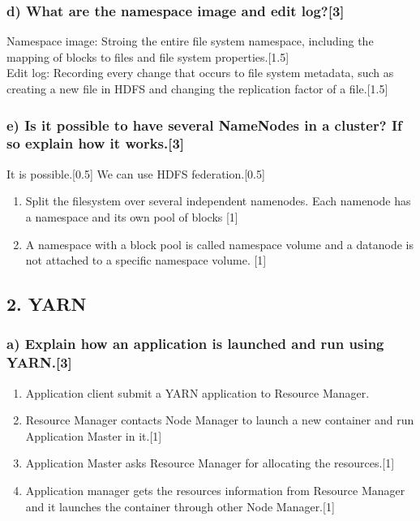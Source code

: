 \documentclass[11pt,a4paper]{article}
\begin{document}
\subsubsection*{d) What are the namespace image and edit log?[3]}
Namespace image: Stroing the entire file system namespace,  including the mapping of blocks to files and file system properties.[1.5]\\
Edit log: Recording every change that occurs to file system metadata, such as creating a new file in HDFS and changing the replication factor of a file.[1.5]

\subsubsection*{e) Is it possible to have several NameNodes in a cluster? If so explain how it works.[3]}
It is possible.[0.5] We can use HDFS federation.[0.5] 
\begin{enumerate}
	\item Split the filesystem over several independent namenodes. Each namenode has a namespace and its own pool of blocks [1]
	\item A namespace with a block pool is called namespace volume and a datanode is not attached to a specific namespace volume. [1]
\end{enumerate}

\subsection*{2. YARN}
\subsubsection*{a) Explain how an application is launched and run using YARN.[3]}
\begin{enumerate}
	\item Application client submit a YARN application to Resource Manager.
	\item Resource Manager contacts Node Manager to launch a new container and run Application Master in it.[1]
	\item Application Master asks Resource Manager for allocating the resources.[1]
	\item Application manager gets the resources information from Resource Manager and it launches the container through other Node Manager.[1]
\end{enumerate}
\end{document}
